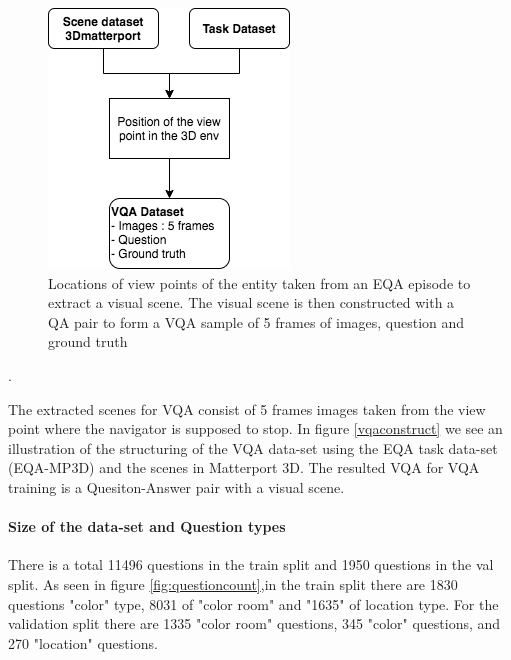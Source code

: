 \begin{figure}[H]
\centering
\includegraphics[scale=0.5]{latex/images/VQAConstruct.png}
\caption{Locations of view points of the entity taken from an EQA episode to extract a visual scene. The visual scene is then constructed with a QA pair to form a VQA sample of 5 frames of images, question and ground truth }
\label{fig:vqaconstruct}
\end{figure}.

The extracted scenes for VQA consist of 5 frames images taken from the view point where the navigator is supposed to stop. In figure \ref{vqaconstruct} we see an illustration of the structuring of the VQA data-set using the EQA task data-set (EQA-MP3D) and the scenes in Matterport 3D. The resulted VQA for VQA training is a Quesiton-Answer pair with a visual scene. 

\paragraph{Size of the data-set and Question types}



There is a total 11496 questions in the train split and 1950 questions in the val split. As seen in figure \ref{fig:questioncount},in the train split there are 1830 questions "color" type, 8031 of "color room"  and "1635" of location type. For the validation split there are 1335 "color room" questions, 345 "color" questions, and 270 "location" questions. 


